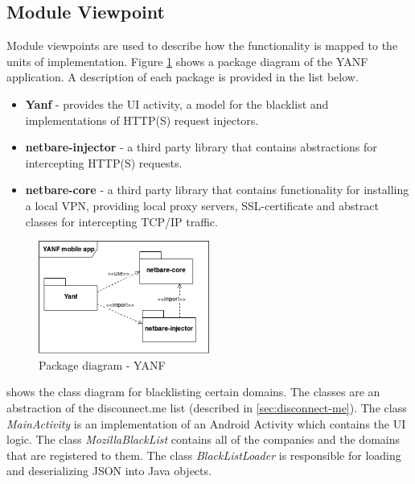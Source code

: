 \documentclass[main.tex]{subfiles}
\begin{document}
\subsection{Module Viewpoint}
Module viewpoints are used to describe how the functionality is mapped to the units of implementation. Figure \ref{fig:modview-package} shows a package diagram of the YANF application. A description of each package is provided in the list below.

\begin{itemize}
    \item \textbf{Yanf} - provides the UI activity, a model for the blacklist and implementations of HTTP(S) request injectors.
    \item \textbf{netbare-injector} - a third party library that contains abstractions for intercepting HTTP(S) requests.
    \item \textbf{netbare-core} - a third party library that contains functionality for installing a local VPN, providing local proxy servers,  SSL-certificate and abstract classes for intercepting TCP/IP traffic.
\end{itemize}

\begin{figure}[H]
    \centering
    \includegraphics[width=0.5\textwidth]{Images/Diagrams/package-diagram.png}
    \caption{Package diagram - YANF}
    \label{fig:modview-package}
\end{figure}

 shows the class diagram for blacklisting certain domains. The classes are an abstraction of the disconnect.me list (described in \autoref{sec:disconnect-me}). The class \textit{MainActivity} is an implementation of an Android Activity which contains the UI logic. The class \textit{MozillaBlackList} contains all of the companies and the domains that are registered to them. The class \textit{BlackListLoader} is responsible for loading and deserializing JSON into Java objects.
\end{document}
